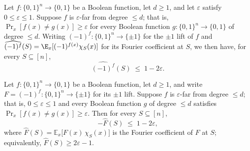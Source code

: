 \begin{lemma}
\label{LowDegreeTest.fourier_coeff_le_of_far_from_degree}
\leanok
{}
Let $f:\{0,1\}^n\to\{0,1\}$ be a Boolean function, let $d\ge 1$, and let $\varepsilon$
satisfy $0\le\varepsilon\le 1$. Suppose $f$ is $\varepsilon$-far from degree $\le d$;
that is, $\Pr_{x}[f(x)\ne g(x)]\ge\varepsilon$ for every Boolean function
$g:\{0,1\}^n\to\{0,1\}$ of degree $\le d$. Writing $(-1)^f:\{0,1\}^n\to\{\pm1\}$ for the
$\pm1$ lift of $f$ and $\widehat{(-1)^f}(S)=\E_x[(-1)^{f(x)}\chi_S(x)]$ for its Fourier
coefficient at $S$, we then have, for every $S\subseteq[n]$,
\[
  \widehat{(-1)^f}(S)\;\le\;1-2\varepsilon.
\]
\end{lemma}

\begin{lemma}
\label{LowDegreeTest.neg_fourier_coeff_le_of_far_from_degree}
\leanok
{}
Let $f : \{0,1\}^n \to \{0,1\}$ be a Boolean function, let $d \ge 1$, and write $F =
(-1)^f : \{0,1\}^n \to \{\pm 1\}$ for its $\pm 1$ lift. Suppose $f$ is $\varepsilon$-far
from degree $\le d$; that is, $0 \le \varepsilon \le 1$ and every Boolean function $g$
of degree $\le d$ satisfies $\Pr_{x}[f(x) \ne g(x)] \ge \varepsilon$. Then for every $S
\subseteq [n]$,
\[
  -\widehat{F}(S) \;\le\; 1 - 2\varepsilon,
\]
where $\widehat{F}(S) = \mathbb{E}_x\bigl[F(x)\,\chi_S(x)\bigr]$ is the Fourier
coefficient of $F$ at $S$; equivalently, $\widehat{F}(S) \ge 2\varepsilon - 1$.
\end{lemma}

